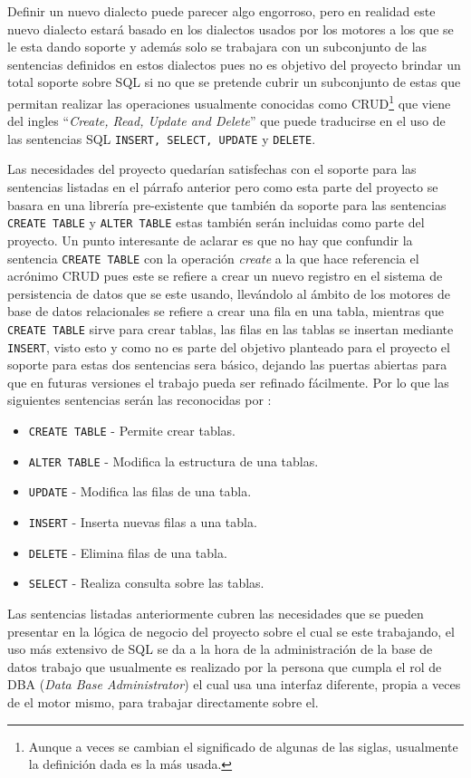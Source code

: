 Definir un nuevo dialecto puede parecer algo engorroso, pero en realidad este nuevo dialecto estará basado en los dialectos usados por los motores a los que se le esta dando soporte y además solo se trabajara con un subconjunto de las sentencias definidos en estos dialectos pues no es objetivo del proyecto brindar un total soporte sobre SQL si no que se pretende cubrir un subconjunto de estas que permitan realizar las operaciones usualmente conocidas como CRUD\footnote{Aunque a veces se cambian el significado de algunas de las siglas, usualmente la definición dada es la más usada.} que viene del ingles ``\textit{Create, Read, Update and Delete}'' que puede traducirse en el uso de las sentencias SQL \verb=INSERT, SELECT, UPDATE= y \verb=DELETE=.

Las necesidades del proyecto quedarían satisfechas con el soporte para las sentencias listadas en el párrafo anterior pero como esta parte del proyecto se basara en una librería pre-existente que también da soporte para las sentencias \verb=CREATE TABLE= y \verb=ALTER TABLE= estas también serán incluidas como parte del proyecto. Un punto interesante de aclarar es que no hay que confundir la sentencia \verb=CREATE TABLE= con la operación \textit{create} a la que hace referencia el acrónimo CRUD pues este se refiere a crear un nuevo registro en el sistema de persistencia de datos que se este usando, llevándolo al ámbito de los motores de base de datos relacionales se refiere a crear una fila en una tabla, mientras que \verb=CREATE TABLE= sirve para crear tablas, las filas en las tablas se insertan mediante \verb=INSERT=, visto esto y como no es parte del objetivo planteado para el proyecto el soporte para estas dos sentencias sera básico, dejando las puertas abiertas para que en futuras versiones el trabajo pueda ser refinado fácilmente. Por lo que las siguientes sentencias serán las reconocidas por \jj:
%
\begin{itemize}
\item \verb=CREATE TABLE= - Permite crear tablas. 
\item \verb=ALTER TABLE= - Modifica la estructura de una tablas.
\item \verb=UPDATE= - Modifica las filas de una tabla.
\item \verb=INSERT= - Inserta nuevas filas a una tabla.
\item \verb=DELETE= - Elimina filas de una tabla.
\item \verb=SELECT= - Realiza consulta sobre las tablas.
\end{itemize}
%
%
Las sentencias listadas anteriormente cubren las necesidades que se pueden presentar en la lógica de negocio del proyecto sobre el cual se este trabajando, el uso más extensivo de SQL se da a la hora de la administración de la base de datos trabajo que usualmente es realizado por la persona que cumpla el rol de DBA (\textit{Data Base Administrator}) el cual usa una interfaz diferente, propia a veces de el motor mismo, para trabajar directamente sobre el.

